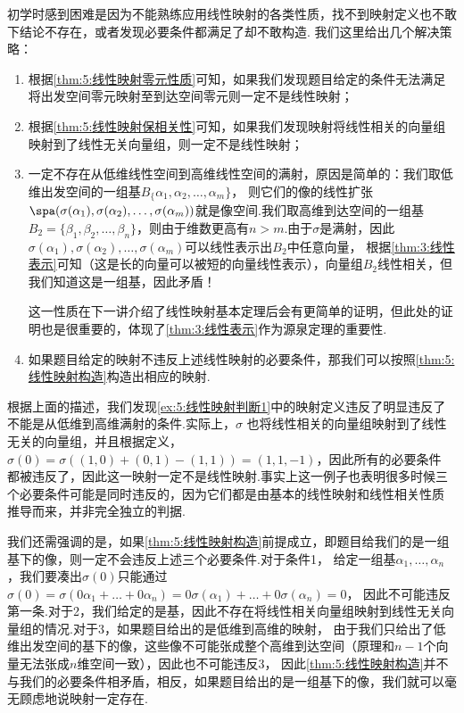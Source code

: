 初学时感到困难是因为不能熟练应用线性映射的各类性质，找不到映射定义也不敢下结论不存在，或者发现必要条件都满足了却不敢构造.
我们这里给出几个解决策略：
\begin{enumerate}
    \item 根据\autoref{thm:5:线性映射零元性质}可知，如果我们发现题目给定的条件无法满足将出发空间零元映射至到达空间零元则一定不是线性映射；
    \item 根据\autoref{thm:5:线性映射保相关性}可知，如果我们发现映射将线性相关的向量组映射到了线性无关向量组，则一定不是线性映射；
    \item 一定不存在从低维线性空间到高维线性空间的满射，原因是简单的：我们取低维出发空间的一组基$B_\{\alpha_1,\alpha_2,\ldots,\alpha_m\}$，
    则它们的像的线性扩张$\spa(\sigma(\alpha_1),\sigma(\alpha_2),\ldots,\sigma(\alpha_m))$就是像空间.我们取高维到达空间的一组基
    $B_2=\{\beta_1,\beta_2,\ldots,\beta_n\}$，则由于维数更高有$n>m$.由于$\sigma$是满射，因此
    $\sigma(\alpha_1),\sigma(\alpha_2),\ldots,\sigma(\alpha_m)$可以线性表示出$B_2$中任意向量，
    根据\autoref{thm:3:线性表示}可知（这是长的向量可以被短的向量线性表示），向量组$B_2$线性相关，但我们知道这是一组基，因此矛盾！

    这一性质在下一讲介绍了线性映射基本定理后会有更简单的证明，但此处的证明也是很重要的，体现了\autoref{thm:3:线性表示}作为源泉定理的重要性.

    \item 如果题目给定的映射不违反上述线性映射的必要条件，那我们可以按照\autoref{thm:5:线性映射构造}构造出相应的映射.
\end{enumerate}

根据上面的描述，我们发现\autoref{ex:5:线性映射判断1}中的映射定义违反了明显违反了不能是从低维到高维满射的条件.实际上，$\sigma$
也将线性相关的向量组映射到了线性无关的向量组，并且根据定义，$\sigma(0)=\sigma((1,0)+(0,1)-(1,1))=(1,1,-1)$，因此所有的必要条件
都被违反了，因此这一映射一定不是线性映射.事实上这一例子也表明很多时候三个必要条件可能是同时违反的，因为它们都是由基本的线性映射和线性相关性质
推导而来，并非完全独立的判据.

我们还需强调的是，如果\autoref{thm:5:线性映射构造}前提成立，即题目给我们的是一组基下的像，则一定不会违反上述三个必要条件.对于条件1，
给定一组基$\alpha_1,\ldots,\alpha_n$，我们要凑出$\sigma(0)$只能通过$\sigma(0)=\sigma(0\alpha_1+\ldots+0\alpha_n)=0\sigma(\alpha_1)+\ldots+0\sigma(\alpha_n)=0$，
因此不可能违反第一条.对于2，我们给定的是基，因此不存在将线性相关向量组映射到线性无关向量组的情况.对于3，如果题目给出的是低维到高维的映射，
由于我们只给出了低维出发空间的基下的像，这些像不可能张成整个高维到达空间（原理和$n-1$个向量无法张成$n$维空间一致），因此也不可能违反3，
因此\autoref{thm:5:线性映射构造}并不与我们的必要条件相矛盾，相反，如果题目给出的是一组基下的像，我们就可以毫无顾虑地说映射一定存在.

